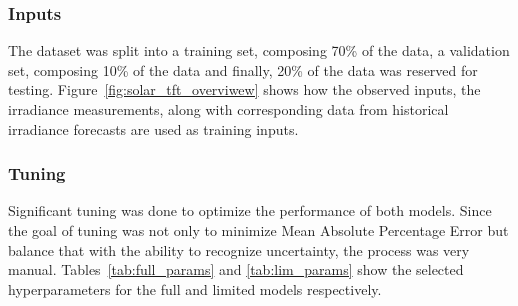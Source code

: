     


    \subsubsection{Inputs}
        The dataset was split into a training set, composing 70\% of the data, a validation set, composing 10\% of the data and finally, 20\% of the data was reserved for testing.
        Figure~\ref{fig:solar_tft_overviwew} shows how the observed inputs, the irradiance measurements, along with corresponding data from historical irradiance forecasts are used as training inputs.
        
    \pagebreak
    \subsubsection{Tuning}
        Significant tuning was done to optimize the performance of both models. Since the goal of tuning was not only to minimize Mean Absolute Percentage Error but balance that with the ability to recognize uncertainty, the process was very manual. Tables~\ref{tab:full_params} and \ref{tab:lim_params} show the selected hyperparameters for the full and limited models respectively.
        
